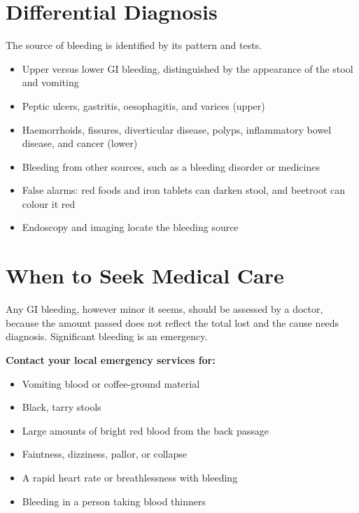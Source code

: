 \section*{Differential Diagnosis}
The source of bleeding is identified by its pattern and tests.
\begin{itemize}
    \item Upper versus lower GI bleeding, distinguished by the appearance of the stool and vomiting
    \item Peptic ulcers, gastritis, oesophagitis, and varices (upper)
    \item Haemorrhoids, fissures, diverticular disease, polyps, inflammatory bowel disease, and cancer (lower)
    \item Bleeding from other sources, such as a bleeding disorder or medicines
    \item False alarms: red foods and iron tablets can darken stool, and beetroot can colour it red
    \item Endoscopy and imaging locate the bleeding source
\end{itemize}

\section*{When to Seek Medical Care}
Any GI bleeding, however minor it seems, should be assessed by a doctor, because the amount passed does not reflect the total lost and the cause needs diagnosis. Significant bleeding is an emergency.

\textbf{Contact your local emergency services for:}
\begin{itemize}
    \item Vomiting blood or coffee-ground material
    \item Black, tarry stools
    \item Large amounts of bright red blood from the back passage
    \item Faintness, dizziness, pallor, or collapse
    \item A rapid heart rate or breathlessness with bleeding
    \item Bleeding in a person taking blood thinners
\end{itemize}

